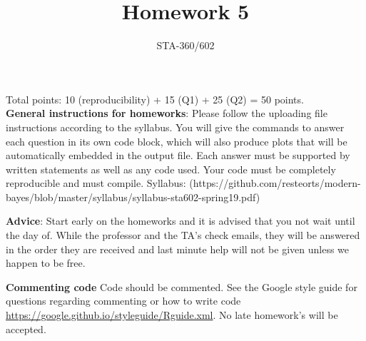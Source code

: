 \documentclass{article}
\begin{document}
\title{Homework 5}
\author{STA-360/602}
\date{}

\maketitle

Total points: 10 (reproducibility) + 15 (Q1) + 25 (Q2) = 50 points. \\

\textbf{General instructions for homeworks}: Please follow the uploading file instructions according to the syllabus. You will give the commands to answer each question in its own code block, which will also produce plots that will be automatically embedded in the output file. Each answer must be supported by written statements as well as any code used. Your code must be completely reproducible and must compile. Syllabus: (https://github.com/resteorts/modern-bayes/blob/master/syllabus/syllabus-sta602-spring19.pdf)

\textbf{Advice}: Start early on the homeworks and it is advised that you not wait until the day of. While the professor and the TA's check emails, they will be answered in the order they are received and last minute help will not be given unless we happen to be free.  

\textbf{Commenting code}
Code should be commented. See the Google style guide for questions regarding commenting or how to write 
code \url{https://google.github.io/styleguide/Rguide.xml}. No late homework's will be accepted.
\end{document}
